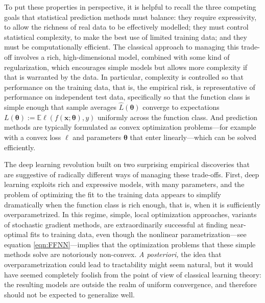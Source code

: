 To put these properties in perspective, it is helpful to recall the three competing goals that statistical prediction methods must balance: they require expressivity, to allow the richness of real data to be effectively modelled; they must control statistical complexity, to make the best use of limited training data; and they must be computationally efficient.  The classical approach to managing this trade-off involves a rich, high-dimensional model, combined with some kind of regularization, which encourages simple models but allows more complexity if that is warranted by the data. In particular, complexity is controlled so that performance on the training data, that is, the empirical risk, is representative of performance on independent test data, specifically so that the function class is simple enough that sample averages $\widehat L({\boldsymbol \theta})$ converge to expectations
$L({\boldsymbol \theta}):={\mathbb E}\ell(f({\boldsymbol x};{\boldsymbol \theta}),y)$ uniformly across the function class. And prediction methods are typically formulated as convex optimization problems---for example with a convex loss
$\ell$ and parameters ${\boldsymbol \theta}$ that enter linearly---which can be solved efficiently.

The deep learning revolution built on two surprising empirical discoveries that are suggestive of radically different ways of managing these trade-offs.  First, deep learning exploits rich and expressive models, with many parameters, and the problem of optimizing the fit to the training data appears to simplify dramatically when the function class is rich enough, that is, when it is sufficiently overparametrized.  In this regime, simple, local optimization approaches, variants of stochastic gradient methods, are extraordinarily successful at finding near-optimal fits to training data, even though the nonlinear parametrization---see equation \eqref{eqn:FFNN}---implies that the optimization problems that these simple methods solve are notoriously non-convex. {\it
A posteriori,\/} the idea that overparametrization could lead to tractability might seem natural, but it would have seemed completely foolish from the point of view of classical learning theory: the resulting models are outside the realm of uniform convergence, and therefore should not be expected to generalize well.

